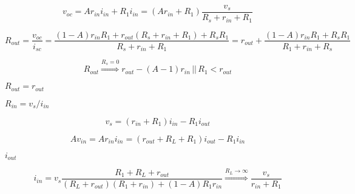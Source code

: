 {\newpage\clearpage
{}%
\begin{displaymath} v_{oc}=Ar_{in}i_{in}+R_1i_{in}=(Ar_{in}+R_1)\frac{v_s}{R_s+r_{in}+R_1} \end{displaymath}%
\lthtmldisplayZ
\lthtmlcheckvsize\clearpage}

{\newpage\clearpage
{}%
\begin{displaymath} R_{out}=\frac{v_{oc}}{i_{sc}}
  =\frac{(1-A)r_{in}R_1+r_{out}(R_s+r_{in}+R_1)+R_sR_1}{R_s+r_{in}+R_1}
  =r_{out}+\frac{(1-A) r_{in}R_1 +R_sR_1}{R_1+r_{in}+R_s}\end{displaymath}%
\lthtmldisplayZ
\lthtmlcheckvsize\clearpage}

{\newpage\clearpage
{}%
\begin{displaymath}
  R_{out}\stackrel{R_s=0}{\Longrightarrow} r_{out}-(A-1) r_{in}\,||\,R_1 < r_{out} 
  \end{displaymath}%
\lthtmldisplayZ
\lthtmlcheckvsize\clearpage}

{\newpage\clearpage
{}%
$R_{out}=r_{out}$%
\lthtmlinlinemathZ
\lthtmlcheckvsize\clearpage}

{\newpage\clearpage
{}%
$R_{in}=v_s/i_{in}$%
\lthtmlinlinemathZ
\lthtmlcheckvsize\clearpage}

{\newpage\clearpage
{}%
\begin{displaymath} v_s=(r_{in}+R_1) i_{in}-R_1 i_{out} \end{displaymath}%
\lthtmldisplayZ
\lthtmlcheckvsize\clearpage}

{\newpage\clearpage
{}%
\begin{displaymath} A v_{in}=Ar_{in}i_{in}=(r_{out}+R_L+R_1)i_{out}-R_1i_{in} \end{displaymath}%
\lthtmldisplayZ
\lthtmlcheckvsize\clearpage}

{\newpage\clearpage
{}%
$i_{out}$%
\lthtmlinlinemathZ
\lthtmlcheckvsize\clearpage}

{\newpage\clearpage
{}%
\begin{displaymath} i_{in}=v_s \frac{R_1+R_L+r_{out}}{(R_L+r_{out})(R_1+r_{in})+(1-A)R_1r_{in}}
  \stackrel{R_L\rightarrow \infty}{\Longrightarrow} \frac{v_s}{r_{in}+R_1} \end{displaymath}%
\lthtmldisplayZ
\lthtmlcheckvsize\clearpage}

